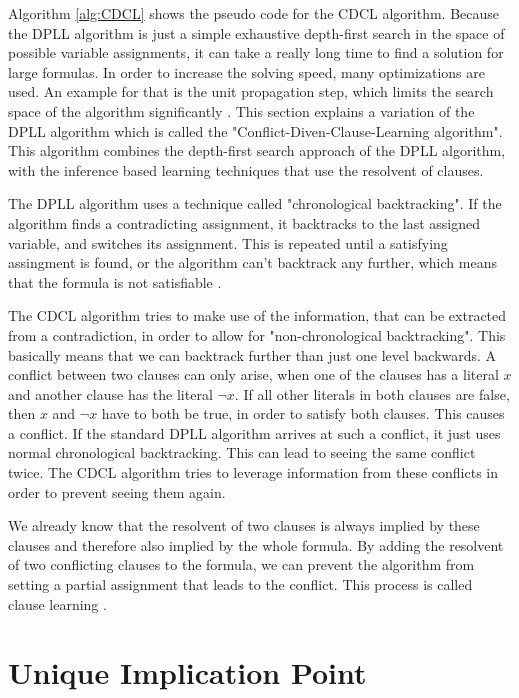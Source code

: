 Algorithm \ref{alg:CDCL} \cite{biere2009handbook} shows the pseudo code for the CDCL algorithm. Because the DPLL algorithm is just a simple exhaustive depth-first search in the space of possible variable assignments, it can take a really long time to find a solution for large formulas. In order to increase the solving speed, many optimizations are used. An example for that is the unit propagation step, which limits the search space of the algorithm significantly \cite{biere2009handbook}. This section explains a variation of the DPLL algorithm which is called the "Conflict-Diven-Clause-Learning algorithm". This algorithm combines the depth-first search approach of the DPLL algorithm, with the inference based learning techniques that use the resolvent of clauses. \cite{biere2009handbook}

The DPLL algorithm uses a technique called "chronological backtracking". If the algorithm finds a contradicting assignment, it backtracks to the last assigned variable, and switches its assignment. This is repeated until a satisfying assingment is found, or the algorithm can't backtrack any further, which means that the formula is not satisfiable \cite{biere2009handbook}.

The CDCL algorithm tries to make use of the information, that can be extracted from a contradiction, in order to allow for "non-chronological backtracking". This basically means that we can backtrack further than just one level backwards. \cite{biere2009handbook}
A conflict between two clauses can only arise, when one of the clauses has a literal $x$ and another clause has the literal $\neg x$. If all other literals in both clauses are false, then $x$ and $\neg x$ have to both be true, in order to satisfy both clauses. This causes a conflict.
If the standard DPLL algorithm arrives at such a conflict, it just uses normal chronological backtracking. This can lead to seeing the same conflict twice. The CDCL algorithm tries to leverage information from these conflicts in order to prevent seeing them again.

We already know that the resolvent of two clauses is always implied by these clauses and therefore also implied by the whole formula. By adding the resolvent of two conflicting clauses to the formula, we can prevent the algorithm from setting a partial assignment that leads to the conflict. This process is called clause learning \cite{biere2009handbook}.

\section{Unique Implication Point}

